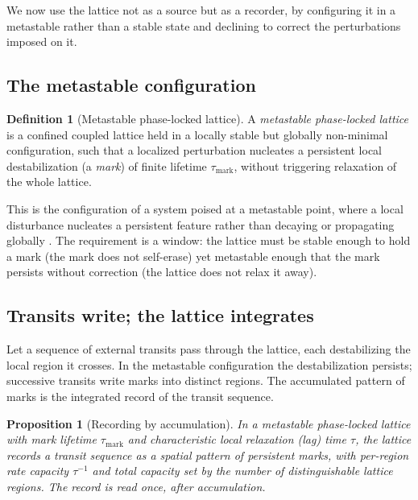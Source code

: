 \documentclass[twocolumn,10pt,a4paper]{article}
\theoremstyle{thmstyle}
\newtheorem{proposition}[theorem]{Proposition}
\theoremstyle{definition}
\newtheorem{definition}[theorem]{Definition}
\theoremstyle{remark}
\begin{document}
We now use the lattice not as a source but as a recorder, by configuring it in
a metastable rather than a stable state and declining to correct the
perturbations imposed on it.

\subsection{The metastable configuration}

\begin{definition}[Metastable phase-locked lattice]
\label{def:metastable}
A \emph{metastable phase-locked lattice} is a confined coupled lattice held in
a locally stable but globally non-minimal configuration, such that a localized
perturbation nucleates a persistent local destabilization (a \emph{mark}) of
finite lifetime $\tau_{\mathrm{mark}}$, without triggering relaxation of the
whole lattice.
\end{definition}

This is the configuration of a system poised at a metastable point, where a
local disturbance nucleates a persistent feature rather than decaying or
propagating globally \citep{langer1969}. The requirement is a window: the
lattice must be stable enough to hold a mark (the mark does not self-erase)
yet metastable enough that the mark persists without correction (the lattice
does not relax it away).

\subsection{Transits write; the lattice integrates}

Let a sequence of external transits pass through the lattice, each
destabilizing the local region it crosses. In the metastable configuration the
destabilization persists; successive transits write marks into distinct
regions. The accumulated pattern of marks is the integrated record of the
transit sequence.

\begin{proposition}[Recording by accumulation]
\label{prop:recording}
In a metastable phase-locked lattice with mark lifetime $\tau_{\mathrm{mark}}$
and characteristic local relaxation (lag) time $\tau$, the lattice records a
transit sequence as a spatial pattern of persistent marks, with per-region
rate capacity $\tau^{-1}$ and total capacity set by the number of
distinguishable lattice regions. The record is read once, after accumulation.
\end{proposition}
\end{document}
